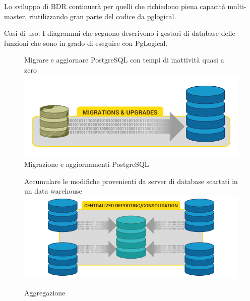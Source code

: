 Lo sviluppo di BDR continuerà per quelli che richiedono piena capacità multi-master, riutilizzando gran parte del codice da pglogical.


Casi di uso:
I diagrammi che seguono descrivono i gestori di database delle funzioni che sono in grado di eseguire con PgLogical.
\begin{figure}[htbp]
\centering
Migrare e aggiornare PostgreSQL con tempi di inattivit\`a quasi a zero
\includegraphics[scale=0.70]{img/pglogical_1.png}\\
\caption{Migrazione e aggiornamenti PostgreSQL \label{figura1} \cite{etichetta3}}
Accumulare le modifiche provenienti da server di database scartati in un data warehouse
\includegraphics[scale=0.70]{img/pglogical_2.png}\\
\caption{Aggregazione \label{figura2} 
\cite{etichetta4}}
\end{figure}
